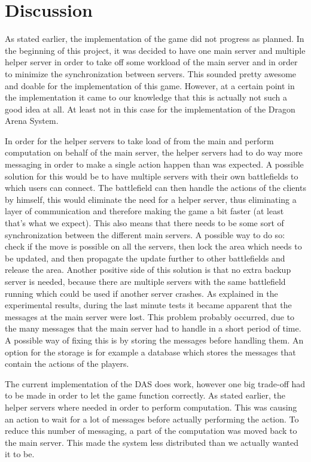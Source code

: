 \section{Discussion}
As stated earlier, the implementation of the game did not progress as planned.
In the beginning of this project, it was decided to have one main server and multiple helper server in order to take off some workload of the main server and in order to minimize the synchronization between servers.
This sounded pretty awesome and doable for the implementation of this game.
However, at a certain point in the implementation it came to our knowledge that this is actually not such a good idea at all.
At least not in this case for the implementation of the Dragon Arena System.

In order for the helper servers to take load of from the main and perform computation on behalf of the main server, the helper servers had to do way more messaging in order to make a single action happen than was expected.
A possible solution for this would be to have multiple servers with their own battlefields to which users can connect.
The battlefield can then handle the actions of the clients by himself, this would eliminate the need for a helper server, thus eliminating a layer of communication and therefore making the game a bit faster (at least that's what we expect). 
This also means that there needs to be some sort of synchronization between the different main servers.
A possible way to do so: check if the move is possible on all the servers, then lock the area which needs to be updated, and then propagate the update further to other battlefields and release the area.
Another positive side of this solution is that no extra backup server is needed, because there are multiple servers with the same battlefield running which could be used if another server crashes.
As explained in the experimental results, during the last minute tests it became apparent that the messages at the main server were lost. 
This problem probably occurred, due to the many messages that the main server had to handle in a short period of time. A possible way of fixing this is by storing the messages before handling them. An option for the storage is for example a database which stores the messages that contain the actions of the players.

The current implementation of the DAS does work, however one big trade-off had to be made in order to let the game function correctly.
As stated earlier, the helper servers where needed in order to perform computation. 
This was causing an action to wait for a lot of messages before actually performing the action.
To reduce this number of messaging, a part of the computation was moved back to the main server.
This made the system less distributed than we actually wanted it to be.

